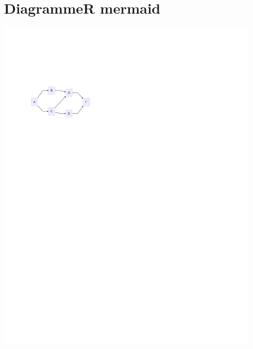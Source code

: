 \documentclass[
  letterpaper,
]{scrbook}
\begin{document}
\hypertarget{diagrammer-mermaid}{%
\section{DiagrammeR mermaid}\label{diagrammer-mermaid}}

\includegraphics{./summary_files/figure-pdf/unnamed-chunk-1-1.pdf}
\end{document}
